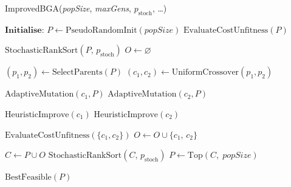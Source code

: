 \documentclass[12pt]{article}
\begin{document}
\begin{algorithm}[htbp]
  \caption{ImprovedBGA(\textit{popSize}, \textit{maxGens}, \(\textit{p}_{\mathrm{stoch}}\), \dots)}
  \label{alg:improved_bga}
  \begin{algorithmic}[1]
    \State \(\textbf{Initialise:}\)
    \State $P \gets \text{PseudoRandomInit}(\textit{popSize})$ 
    \State $\text{EvaluateCostUnfitness}(P)$ 
    
      \State $\text{StochasticRankSort}(P,\, \textit{p}_{\mathrm{stoch}})$ 
      \State $O \gets \varnothing$ 

        \State $(p_1, p_2) \gets \text{SelectParents}(P)$ 
        \State $(c_1, c_2) \gets \text{UniformCrossover}(p_1, p_2)$ 
        
        \State $\text{AdaptiveMutation}(c_1, P)$ 
        \State $\text{AdaptiveMutation}(c_2, P)$

        \State $\text{HeuristicImprove}(c_1)$ 
        \State $\text{HeuristicImprove}(c_2)$
        
        \State $\text{EvaluateCostUnfitness}(\{c_1, c_2\})$
        \State $O \gets O \cup \{c_1,\, c_2\}$
      \EndWhile

      \State $C \gets P \cup O$ 
      \State $\text{StochasticRankSort}(C,\, \textit{p}_{\mathrm{stoch}})$ 
      \State $P \gets \text{Top}(C,\; \textit{popSize})$
    \EndFor
    
    \State \Return $\text{BestFeasible}(P)$ 
  \end{algorithmic}
\end{algorithm}
\end{document}
